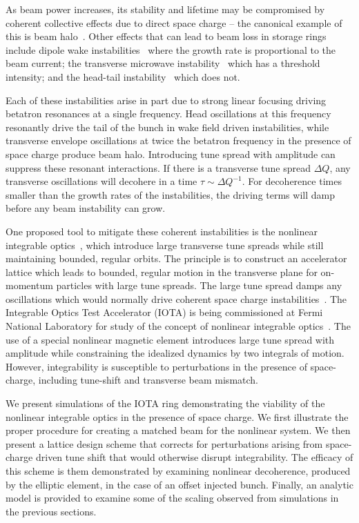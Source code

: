 \documentclass[aps,prstab,twocolumn, groupedaddress]{revtex4-1}
\begin{document}
As beam power increases, its stability and lifetime may be compromised by coherent collective effects due to direct space charge -- the canonical example of this is beam halo~\cite{oconnell_etal:93, gluckstern:94, jameson:94, bruhwiler:95}. Other effects that can lead to beam loss in storage rings include dipole wake instabilities~\cite{courant_sessler:66, ferlinghi_pellegrini_touschek:66} where the growth rate is proportional to the beam current; the transverse microwave instability~\cite{talman:82} which has a threshold intensity; and the head-tail instability~\cite{pellegrini:69} which does not.

Each of these instabilities arise in part due to strong linear focusing driving betatron resonances at a single frequency. Head oscillations at this frequency resonantly drive the tail of the bunch in wake field driven instabilities, while  transverse envelope oscillations at twice the betatron frequency in the presence of space charge produce beam halo. Introducing tune spread with amplitude can suppress these resonant interactions. If there is a transverse tune spread $\Delta Q$, any transverse oscillations will decohere in a time $\tau \sim \Delta Q^{-1}$. For decoherence times smaller than the growth rates of the instabilities, the driving terms will damp before any beam instability can grow.

One proposed tool to mitigate these coherent instabilities is the nonlinear integrable optics~\cite{danilovNagaitsev:2010, nagValDan:2010}, which introduce large transverse tune spreads while still maintaining bounded, regular orbits. The principle is to construct an accelerator lattice which leads to bounded, regular motion in the transverse plane for on-momentum particles with large tune spreads. The large tune spread damps any oscillations which would normally drive coherent space charge instabilities~\cite{webb:12}. The Integrable Optics Test Accelerator (IOTA) is being commissioned at Fermi National Laboratory for study of the concept of nonlinear integrable optics~\cite{IOTA_techreport}. The use of a special nonlinear magnetic element introduces large tune spread with amplitude while constraining the idealized dynamics by two integrals of motion. However, integrability is susceptible to perturbations in the presence of space-charge, including tune-shift and transverse beam mismatch.

We present simulations of the IOTA ring demonstrating the viability of the nonlinear 
integrable optics in the presence of space charge. We first illustrate the proper procedure 
for creating a matched beam for the nonlinear system. We then present a lattice design 
scheme that corrects for perturbations arising from space-charge driven tune shift that 
would otherwise disrupt integrability. The efficacy of this scheme is them demonstrated 
by examining nonlinear decoherence, produced by the elliptic element, in the case of an 
offset injected bunch. Finally, an analytic model is provided to examine some of the 
scaling observed from simulations in the previous sections.
\end{document}
